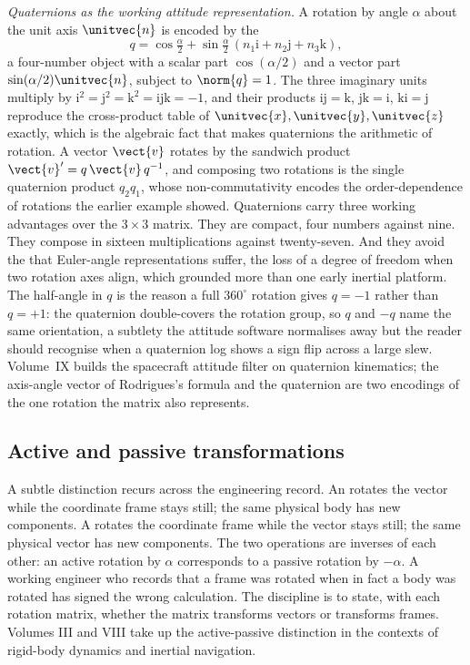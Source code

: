 \begin{mastery}
\textit{Quaternions as the working attitude representation.} A rotation
by angle $\alpha$ about the unit axis $\unitvec{n}$ is encoded by the
\[
q = \cos\tfrac{\alpha}{2} + \sin\tfrac{\alpha}{2}\,(n_{1}\mathrm{i} +
n_{2}\mathrm{j} + n_{3}\mathrm{k}),
\]
a four-number object with a scalar part $\cos(\alpha/2)$ and a vector
part $\sin(\alpha/2)\unitvec{n}$, subject to $\norm{q} = 1$. The three
imaginary units multiply by $\mathrm{i}^{2} = \mathrm{j}^{2} =
\mathrm{k}^{2} = \mathrm{ijk} = -1$, and their products $\mathrm{ij} =
\mathrm{k}$, $\mathrm{jk} = \mathrm{i}$, $\mathrm{ki} = \mathrm{j}$
reproduce the cross-product table of $\unitvec{x}, \unitvec{y},
\unitvec{z}$ exactly, which is the algebraic fact that makes
quaternions the arithmetic of rotation. A vector $\vect{v}$ rotates by
the sandwich product $\vect{v}' = q\,\vect{v}\,q^{-1}$, and composing
two rotations is the single quaternion product $q_{2}q_{1}$, whose
non-commutativity encodes the order-dependence of rotations the earlier
example showed. Quaternions carry three working advantages over the
$3\times 3$ matrix. They are compact, four numbers against nine. They
compose in sixteen multiplications against twenty-seven. And they avoid
the  that Euler-angle representations suffer, the
loss of a degree of freedom when two rotation axes align, which
grounded more than one early inertial platform. The half-angle in
$q$ is the reason a full $360^{\circ}$ rotation gives $q = -1$ rather
than $q = +1$: the quaternion double-covers the rotation group, so
$q$ and $-q$ name the same orientation, a subtlety the attitude
software normalises away but the reader should recognise when a
quaternion log shows a sign flip across a large slew. Volume~IX builds
the spacecraft attitude filter on quaternion kinematics; the axis-angle
vector of Rodrigues's formula and the quaternion are two encodings of
the one rotation the matrix also represents.
\end{mastery}

\subsection{Active and passive transformations}

A subtle distinction recurs across the engineering record. An
 rotates the vector while the
coordinate frame stays still; the same physical body has new
components. A  rotates the coordinate
frame while the vector stays still; the same physical vector has new
components. The two operations are inverses of each other: an
active rotation by $\alpha$ corresponds to a passive rotation by
$-\alpha$. A working engineer who records that a frame was rotated
when in fact a body was rotated has signed the wrong calculation.
The discipline is to state, with each rotation matrix, whether the
matrix transforms vectors or transforms frames. Volumes III and VIII
take up the active-passive distinction in the contexts of rigid-body
dynamics and inertial navigation.

